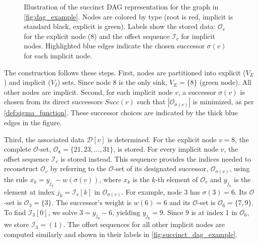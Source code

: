 \begin{figure}[htbp]
    \caption{Illustration of the succinct DAG representation for the graph in \autoref{fig:dag_example}. Nodes are colored by type (root is red, implicit is standard black, explicit is green). Labels show the stored data: $\mathcal{O}_v$ for the explicit node (8) and the offset sequence $\mathcal{I}_v$ for implicit nodes. Highlighted blue edges indicate the chosen successor $\sigma(v)$ for each implicit node.}
    \label{fig:succinct_dag_example}
\end{figure}

The construction follows these steps. First, nodes are partitioned into explicit ($V_E$) and implicit ($V_I$) sets. Since node 8 is the only sink, $V_E=\{8\}$ (green node). All other nodes are implicit. Second, for each implicit node $v$, a successor $\sigma(v)$ is chosen from its direct successors $Succ(v)$ such that $|\mathcal{O}_{\sigma(v)}|$ is minimized, as per \ref{def:sigma_function}. These successor choices are indicated by the thick blue edges in the figure.

Third, the associated data $\mathcal{D}[v]$ is determined. For the explicit node $v=8$, the complete $\mathcal{O}$-set, $\mathcal{O}_8=\{21, 23, ..., 31\}$, is stored. For every implicit node $v$, the offset sequence $\mathcal{I}_v$ is stored instead. This sequence provides the indices needed to reconstruct $\mathcal{O}_v$ by referring to the $\mathcal{O}$-set of its designated successor, $\mathcal{O}_{\sigma(v)}$, using the rule $x_k = y_{j_k} - w(\sigma(v))$, where $x_k$ is the $k$-th element of $\mathcal{O}_v$ and $y_{j_k}$ is the element at index $j_k = \mathcal{I}_v[k]$ in $\mathcal{O}_{\sigma(v)}$. For example, node 3 has $\sigma(3)=6$. Its $\mathcal{O}$-set is $\mathcal{O}_3=\{3\}$. The successor's weight is $w(6)=6$ and its $\mathcal{O}$-set is $\mathcal{O}_6=\{7, 9\}$. To find $\mathcal{I}_3[0]$, we solve $3 = y_{j_0} - 6$, yielding $y_{j_0}=9$. Since 9 is at index 1 in $\mathcal{O}_6$, we store $\mathcal{I}_3=(1)$. The offset sequences for all other implicit nodes are computed similarly and shown in their labels in \autoref{fig:succinct_dag_example}.

